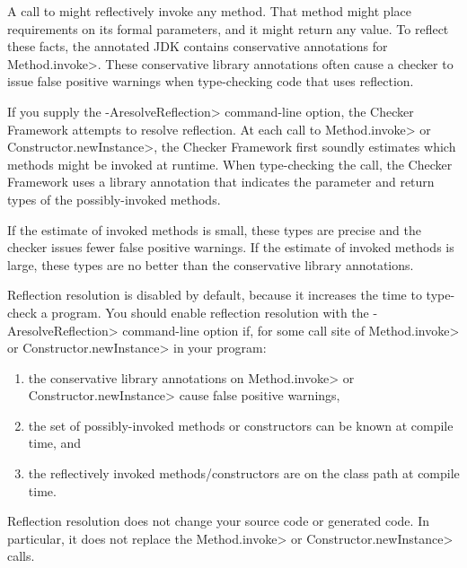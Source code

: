 \htmlhr

\def\reflectionAnno#1#2{\refqualclass{common/reflection/qual}{#1}\code{#2}}



A call to
might reflectively invoke any method.  That method might place requirements
on its formal parameters, and it might return any value.  To reflect these
facts, the annotated JDK contains
conservative annotations for \<Method.invoke>.
These conservative library annotations often cause a checker to issue false
positive warnings when type-checking code that uses reflection.

If you supply the \<-AresolveReflection> command-line option, the Checker
Framework attempts to resolve reflection.  At each call to \<Method.invoke>
or \<Constructor.newInstance>, the Checker Framework first soundly estimates
which methods might be invoked at runtime.  When type-checking the call, the
Checker Framework uses a library annotation that indicates the parameter
and return types of the possibly-invoked methods.

If the estimate of invoked methods is small, these types are precise and
the checker issues fewer false positive warnings.
If the estimate of invoked methods is large, these types are no better than the
conservative library annotations.

Reflection resolution is disabled by default, because it increases the time
to type-check a program.
You should enable reflection resolution with the \<-AresolveReflection>
command-line option if, for some call site of \<Method.invoke> or
\<Constructor.newInstance> in your program:
\begin{enumerate}
\item
  the conservative library annotations on \<Method.invoke> or
  \<Constructor.newInstance> cause false positive warnings,
\item
  the set of possibly-invoked methods or constructors can be known at
  compile time,
  and
\item
  the reflectively invoked methods/constructors are on the class path at
  compile time.
\end{enumerate}

Reflection resolution does not change your source code or generated code.
In particular, it does not replace the \<Method.invoke> or
\<Constructor.newInstance> calls.

